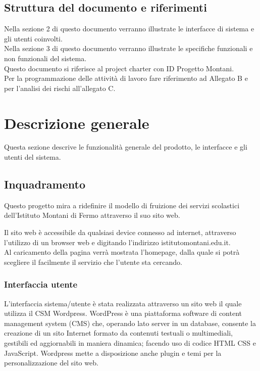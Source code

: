 \documentclass{article}
\begin{document}
	\subsection{\textbf{Struttura del documento e riferimenti}}
	Nella sezione 2 di questo documento verranno illustrate le interfacce di sistema e gli utenti coinvolti.\\
	Nella sezione 3 di questo documento verranno illustrate le specifiche funzionali e non funzionali del sistema.\\
	Questo documento si riferisce al project charter con ID Progetto Montani.\\
	Per la programmazione delle attività di lavoro fare riferimento ad Allegato B e per l'analisi dei rischi all'allegato C.\\
	
	\vspace{1cm}
	
	\section{\textbf{Descrizione generale}}
     Questa sezione descrive le funzionalità generale del prodotto, le interfacce e gli utenti del sistema.

	\subsection{\textbf{Inquadramento}}
	Questo progetto mira a ridefinire il modello di fruizione dei servizi scolastici dell'Istituto Montani di Fermo attraverso il suo sito web.
	
	Il sito web è accessibile da qualsiasi device connesso ad internet, attraverso l'utilizzo di un browser web e digitando l'indirizzo istitutomontani.edu.it.\\
	Al caricamento della pagina verrà mostrata l'homepage, dalla quale si potrà scegliere il facilmente il servizio che l'utente sta cercando. 
	
	\subsubsection{\textbf{Interfaccia utente}}
	L’interfaccia sistema/utente è stata realizzata attraverso un sito web il quale utilizza il CSM Wordpress. WordPress è una piattaforma software di content management system (CMS) che, operando lato server in un database, consente la creazione di un sito Internet formato da contenuti testuali o multimediali, gestibili ed aggiornabili in maniera dinamica; facendo uso di codice HTML CSS e JavaScript. Wordpress mette a disposizione anche plugin e temi per la personalizzazione del sito web. 
	
\end{document}
